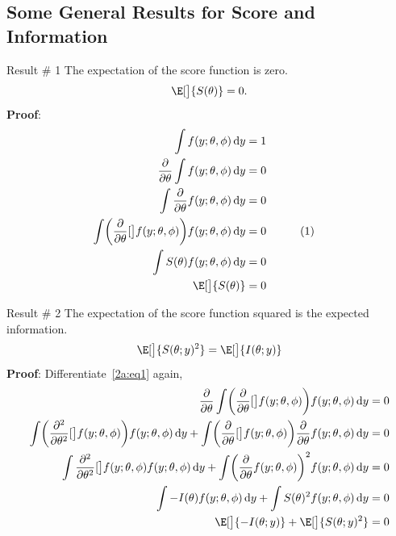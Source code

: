 \documentclass{article}\usepackage[]{graphicx}\usepackage[svgnames]{xcolor}
\let\log\relax%
\begin{document}
\subsection*{Some General Results for Score and Information}
\begin{Result}{Result \# 1}
    The expectation of the score function is zero.
    \[ \E[\big]{S(\theta)}=0. \]
    \tcblower{}
    \textbf{Proof}:
    \begin{align*}
        \int f(y;\theta,\phi)\odif{y}                                                         & =1                               \\
        \pdv*{\int f(y;\theta,\phi)\odif{y}}{\theta}                                          & =0                               \\
        \int\pdv*{f(y;\theta,\phi)}{\theta} \odif{y}                                          & =0                               \\
        \int\biggl(\pdv*{\log[\big]{f(y;\theta,\phi)}}{\theta}\biggr)f(y;\theta,\phi)\odif{y} & =0 &  & \label{2a:eq1}\tag*{(1)} \\
        \int S(\theta)f(y;\theta,\phi)\odif{y}                                                & =0                               \\
        \E[\big]{S(\theta)}                                                                   & =0
    \end{align*}
\end{Result}
\begin{Result}{Result \# 2}
    The expectation of the score function squared is the expected information.
    \[  \E[\big]{S(\theta;y)^2}=\E[\big]{I(\theta;y)} \]
    \tcblower{}
    \textbf{Proof}: Differentiate~\ref{2a:eq1} again,
    \begin{align*}
        \pdv*{\int\biggl(\pdv*{\log[\big]{f(y;\theta,\phi)}}{\theta}\biggr)f(y;\theta,\phi)\odif{y}}{\theta}                                                                                                 & =0 \\
        \int \biggl(\pdv*[order=2]{\log[\big]{f(y;\theta,\phi)}}{\theta}\biggr)f(y;\theta,\phi)\odif{y}+\int\biggl(\pdv*{\log[\big]{f(y;\theta,\phi)}}{\theta}\biggr)\pdv*{f(y;\theta,\phi)}{\theta}\odif{y} & =0 \\
        \int \pdv*[order=2]{\log[\big]{f(y;\theta,\phi)}}{\theta}f(y;\theta,\phi)\odif{y}+\int\biggl(\pdv*{f(y;\theta,\phi)}{\theta}\biggr)^2 f(y;\theta,\phi)\odif{y}                                       & =0 \\
        \int -I(\theta)f(y;\theta,\phi)\odif{y}+\int S(\theta)^2 f(y;\theta,\phi)\odif{y}                                                                                                                    & =0 \\
        \E[\big]{-I(\theta;y)}+\E[\big]{S(\theta;y)^2}                                                                                                                                                       & =0
    \end{align*}
\end{Result}
\end{document}
